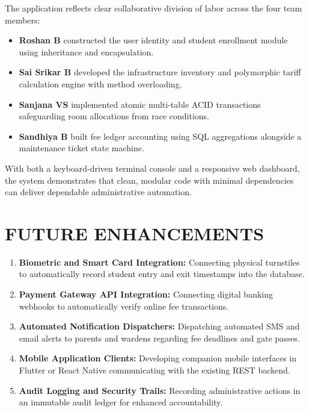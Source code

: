 \documentclass[12pt,a4paper]{report}
\begin{document}
The application reflects clear collaborative division of labor across the four team members:
\begin{itemize}
\item \textbf{Roshan B} constructed the user identity and student enrollment module using inheritance and encapsulation.
\item \textbf{Sai Srikar B} developed the infrastructure inventory and polymorphic tariff calculation engine with method overloading.
\item \textbf{Sanjana VS} implemented atomic multi-table ACID transactions safeguarding room allocations from race conditions.
\item \textbf{Sandhiya B} built fee ledger accounting using SQL aggregations alongside a maintenance ticket state machine.
\end{itemize}

With both a keyboard-driven terminal console and a responsive web dashboard, the system demonstrates that clean, modular code with minimal dependencies can deliver dependable administrative automation.

\newpage

\chapter{FUTURE ENHANCEMENTS}

\begin{enumerate}
\item \textbf{Biometric and Smart Card Integration:} Connecting physical turnstiles to automatically record student entry and exit timestamps into the database.
\item \textbf{Payment Gateway API Integration:} Connecting digital banking webhooks to automatically verify online fee transactions.
\item \textbf{Automated Notification Dispatchers:} Dispatching automated SMS and email alerts to parents and wardens regarding fee deadlines and gate passes.
\item \textbf{Mobile Application Clients:} Developing companion mobile interfaces in Flutter or React Native communicating with the existing REST backend.
\item \textbf{Audit Logging and Security Trails:} Recording administrative actions in an immutable audit ledger for enhanced accountability.
\end{enumerate}

\newpage
\end{document}
